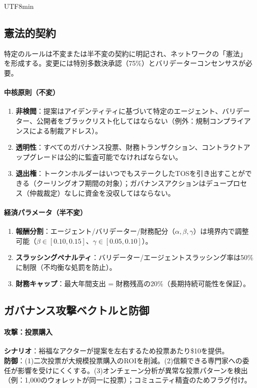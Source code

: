 \documentclass[11pt]{article}
\begin{document}
\begin{CJK}{UTF8}{min}
\begin{itemize}[noitemsep]
\subsection{憲法的契約}

特定のルールは不変または半不変の契約に明記され、ネットワークの「憲法」を形成する。変更には特別多数決承認（75\%）とバリデーターコンセンサスが必要。

\paragraph{中核原則（不変）}
\begin{enumerate}[noitemsep]
  \item \textbf{非検閲}：提案はアイデンティティに基づいて特定のエージェント、バリデーター、公開者をブラックリスト化してはならない（例外：規制コンプライアンスによる制裁アドレス）。
  \item \textbf{透明性}：すべてのガバナンス投票、財務トランザクション、コントラクトアップグレードは公的に監査可能でなければならない。
  \item \textbf{退出権}：トークンホルダーはいつでもステークしたTOSを引き出すことができる（クーリングオフ期間の対象）；ガバナンスアクションはデュープロセス（仲裁裁定）なしに資金を没収してはならない。
\end{enumerate}

\paragraph{経済パラメータ（半不変）}
\begin{enumerate}[noitemsep]
  \item \textbf{報酬分割}：エージェント/バリデーター/財務配分（$\alpha, \beta, \gamma$）は境界内で調整可能（$\beta \in [0.10, 0.15]$、$\gamma \in [0.05, 0.10]$）。
  \item \textbf{スラッシングペナルティ}：バリデーター/エージェントスラッシング率は50\%に制限（不均衡な処罰を防止）。
  \item \textbf{財務キャップ}：最大年間支出 = 財務残高の20\%（長期持続可能性を保証）。
\end{enumerate}

\subsection{ガバナンス攻撃ベクトルと防御}

\paragraph{攻撃：投票購入}
\textbf{シナリオ}：裕福なアクターが提案を左右するため投票あたり\$10を提供。\\
\textbf{防御}：(1)二次投票が大規模投票購入のROIを削減。(2)信頼できる専門家への委任が影響を受けにくくする。(3)オンチェーン分析が異常な投票パターンを検出（例：1,000のウォレットが同一に投票）；コミュニティ精査のためフラグ付け。


\end{itemize}
\end{CJK}
\end{document}
